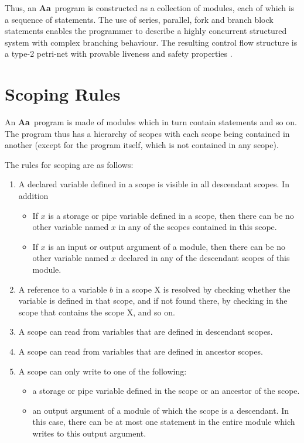 \documentclass{article}
\newcommand{\Aa}{{\bf Aa}~}
\begin{document}
Thus, an \Aa program is constructed as a collection of modules,
each of which is a sequence of statements.  The use of series,
parallel, fork and branch block
statements enables the programmer to describe a highly concurrent
structured system with complex branching behaviour.  
The resulting control flow structure is a
type-2 petri-net with provable liveness and safety properties \cite{ref:SameerPhD}.

\section{Scoping Rules} \label{sec:Scopes}

An \Aa program is made of modules which in turn contain statements
and so on.  The program thus has a hierarchy of scopes with each
scope being contained in another (except for the program itself,
which is not contained in any scope).

The rules for scoping are as follows:
\begin{enumerate}
\item A declared variable defined in a scope is visible
in all descendant scopes. In addition
\begin{itemize}
\item If $x$ is a storage or pipe variable defined in a scope, then
there can be no other variable named $x$ in any of the scopes
contained in this scope.
\item If $x$ is an input or output argument of a module, then
there can be no other variable named $x$ declared in any of
the descendant scopes of this module.
\end{itemize}
\item A reference to a variable $b$ in a scope X is resolved by checking
whether the variable is defined in that scope, and if not found there,
by checking in the scope that contains the scope X, and so on.
\item A scope can read from variables that are defined in descendant
scopes.  
\item A scope can read from variables that are defined in ancestor scopes.
\item A scope can only write to one of the following:
\begin{itemize}
\item a storage or pipe variable defined in the scope or an ancestor
of the scope.
\item an output argument of a module of which the scope is a descendant.
In this case, there can be at most one statement in the entire module
which writes to this output argument.
\end{itemize}
\end{enumerate}
\end{document}
